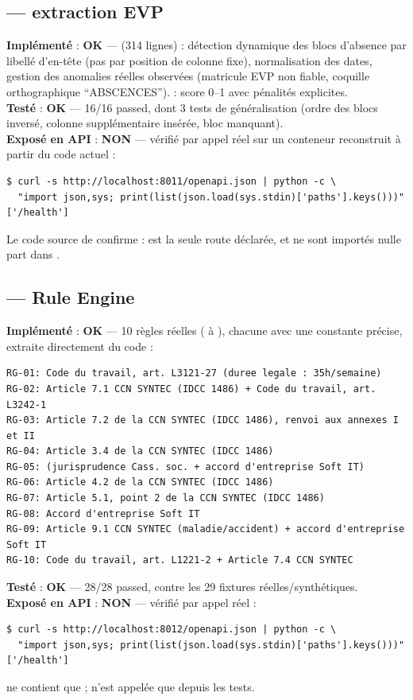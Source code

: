 \documentclass[11pt,a4paper]{article}
\newcommand{\etat}[2]{\textbf{#1} : #2}
\newcommand{\ok}{\textcolor{green!45!black}{\textbf{OK}}}
\newcommand{\ko}{\textcolor{red!60!black}{\textbf{NON}}}
\begin{document}
\subsection{ --- extraction EVP}
\label{sec:extracteur-evp}
\etat{Impl\'ement\'e}{\ok} ---  (314 lignes) : d\'etection dynamique des blocs d'absence par libell\'e d'en-t\^ete (pas par position de colonne fixe), normalisation des dates, gestion des anomalies r\'eelles observ\'ees (matricule EVP non fiable, coquille orthographique ``ABSCENCES'').  : score 0--1 avec p\'enalit\'es explicites.\\
\etat{Test\'e}{\ok} --- 16/16 passed, dont 3 tests de g\'en\'eralisation (ordre des blocs invers\'e, colonne suppl\'ementaire ins\'er\'ee, bloc manquant).\\
\etat{Expos\'e en API}{\ko} --- v\'erifi\'e par appel r\'eel sur un conteneur reconstruit \`a partir du code actuel :
\begin{lstlisting}
$ curl -s http://localhost:8011/openapi.json | python -c \
  "import json,sys; print(list(json.load(sys.stdin)['paths'].keys()))"
['/health']
\end{lstlisting}
Le code source de  confirme :  est la seule route d\'eclar\'ee,  et  ne sont import\'es nulle part dans .

\subsection{ --- Rule Engine}
\label{sec:compliance}
\etat{Impl\'ement\'e}{\ok} --- 10 r\`egles r\'eelles ( \`a ), chacune avec une constante  pr\'ecise, extraite directement du code :
\begin{lstlisting}
RG-01: Code du travail, art. L3121-27 (duree legale : 35h/semaine)
RG-02: Article 7.1 CCN SYNTEC (IDCC 1486) + Code du travail, art. L3242-1
RG-03: Article 7.2 de la CCN SYNTEC (IDCC 1486), renvoi aux annexes I et II
RG-04: Article 3.4 de la CCN SYNTEC (IDCC 1486)
RG-05: (jurisprudence Cass. soc. + accord d'entreprise Soft IT)
RG-06: Article 4.2 de la CCN SYNTEC (IDCC 1486)
RG-07: Article 5.1, point 2 de la CCN SYNTEC (IDCC 1486)
RG-08: Accord d'entreprise Soft IT
RG-09: Article 9.1 CCN SYNTEC (maladie/accident) + accord d'entreprise Soft IT
RG-10: Code du travail, art. L1221-2 + Article 7.4 CCN SYNTEC
\end{lstlisting}
\etat{Test\'e}{\ok} --- 28/28 passed, contre les 29 fixtures r\'eelles/synth\'etiques.\\
\etat{Expos\'e en API}{\ko} --- v\'erifi\'e par appel r\'eel :
\begin{lstlisting}
$ curl -s http://localhost:8012/openapi.json | python -c \
  "import json,sys; print(list(json.load(sys.stdin)['paths'].keys()))"
['/health']
\end{lstlisting}
 ne contient que  ;  n'est appel\'ee que depuis les tests.
\end{document}
